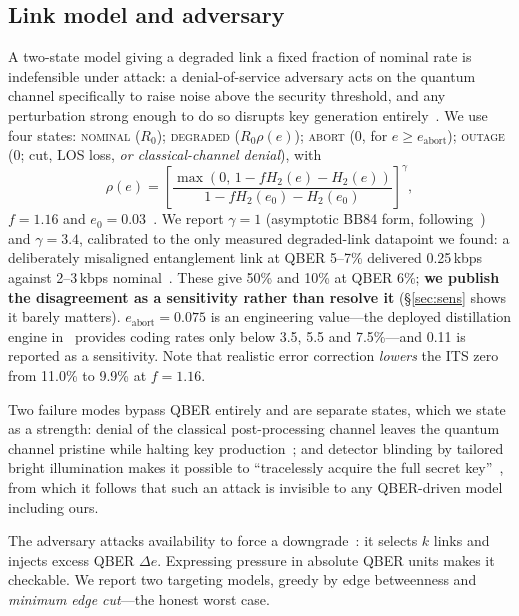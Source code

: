 \documentclass[conference]{IEEEtran}
\begin{document}
\subsection{Link model and adversary}\label{sec:link}
A two-state model giving a degraded link a fixed fraction of nominal rate is
indefensible under attack: a denial-of-service adversary acts on the quantum
channel specifically to raise noise above the security threshold, and any
perturbation strong enough to do so disrupts key generation
entirely~\cite{alleaume}. We use four states: \textsc{nominal} ($R_0$);
\textsc{degraded} ($R_0\rho(e)$); \textsc{abort} ($0$, for
$e\ge e_{\mathrm{abort}}$); \textsc{outage} ($0$; cut, LOS loss, \emph{or
classical-channel denial}), with
\begin{equation}
\rho(e)=\left[\frac{\max\!\left(0,\,1-fH_2(e)-H_2(e)\right)}
{1-fH_2(e_0)-H_2(e_0)}\right]^{\gamma},
\end{equation}
$f=1.16$ and $e_0=0.03$~\cite{sasaki}. We report $\gamma=1$ (asymptotic BB84
form, following~\cite{ma}) and $\gamma=3.4$, calibrated to the only measured
degraded-link datapoint we found: a deliberately misaligned entanglement link at
QBER 5--7\% delivered 0.25\,kbps against 2--3\,kbps nominal~\cite{sasaki}. These
give 50\% and 10\% at QBER 6\%; \textbf{we publish the disagreement as a
sensitivity rather than resolve it} (\S\ref{sec:sens} shows it barely matters).
$e_{\mathrm{abort}}=0.075$ is an engineering value---the deployed distillation
engine in~\cite{sasaki} provides coding rates only below 3.5, 5.5 and 7.5\%---and
0.11 is reported as a sensitivity. Note that realistic error correction
\emph{lowers} the ITS zero from 11.0\% to 9.9\% at $f=1.16$.

Two failure modes bypass QBER entirely and are separate states, which we state as
a strength: denial of the classical post-processing channel leaves the quantum
channel pristine while halting key production~\cite{mehic}; and detector blinding
by tailored bright illumination makes it possible to ``tracelessly acquire the
full secret key''~\cite{lydersen}, from which it follows that such an attack is
invisible to any QBER-driven model including ours.

The adversary attacks availability to force a downgrade~\cite{schartner}: it
selects $k$ links and injects excess QBER $\Delta e$. Expressing pressure in
absolute QBER units makes it checkable. We report two targeting models, greedy by
edge betweenness and \emph{minimum edge cut}---the honest worst case.
\end{document}
